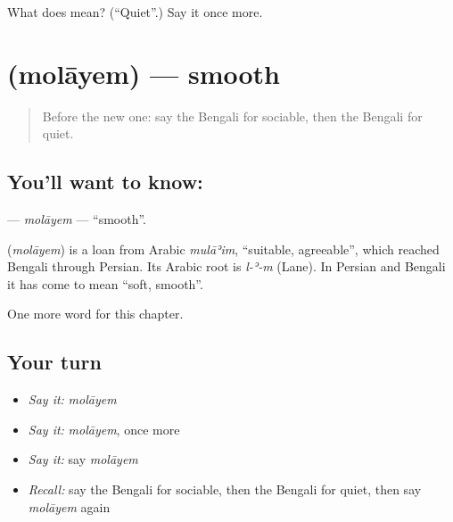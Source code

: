 \begin{tcolorbox}[breakable,colback=teal!4,colframe=teal!35!black,title={Before you move on}]
What does  mean? (\textquotedblleft{}Quiet\textquotedblright{}.) Say it once more.
\end{tcolorbox}
\section[\texorpdfstring{\bn{মোলায়েম} (molāyem)}{মোলায়েম (molāyem)}]{ (molāyem) — smooth}

\label{lesson:BN-C144-molayem}



\begin{quote}
Before the new one: say the Bengali for sociable, then the Bengali for quiet.
\end{quote}

\subsection*{You'll want to know: }
\textbf{} — \emph{molāyem} — \textquotedblleft{}smooth\textquotedblright{}.

\begin{cousinweb}
\textbf{} (\emph{molāyem}) is a loan from Arabic \emph{mulāʾim}, \textquotedblleft{}suitable, agreeable\textquotedblright{}, which reached Bengali through Persian. Its Arabic root is \emph{l-ʾ-m} (Lane). In Persian and Bengali it has come to mean \textquotedblleft{}soft, smooth\textquotedblright{}.
\end{cousinweb}

\begin{grammarlens}[title={What you've built}]
One more word for this chapter.
\end{grammarlens}

\subsection*{Your turn}
\begin{itemize}
\raggedright
  \item \emph{Say it:} \emph{molāyem}
  \item \emph{Say it:} \emph{molāyem}, once more
  \item \emph{Say it:} say \emph{molāyem}
  \item \emph{Recall:} say the Bengali for sociable, then the Bengali for quiet, then say \emph{molāyem} again
\end{itemize}

